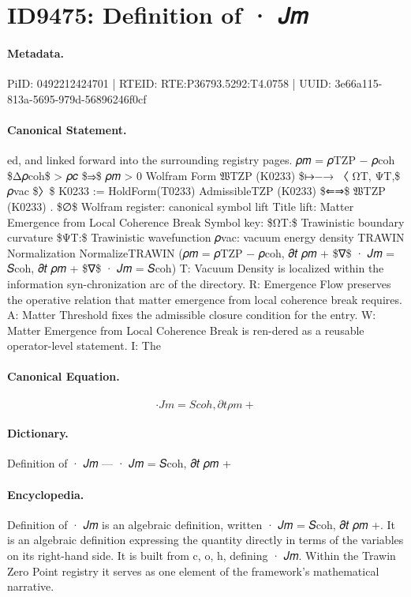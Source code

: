 \section*{ID9475: Definition of · 𝐽𝑚}
\paragraph{Metadata.}
PiID: 0492212424701 | RTEID: RTE:P36793.5292:T4.0758 | UUID: 3e66a115-813a-5695-979d-56896246f0cf

\paragraph{Canonical Statement.}
ed, and linked forward into the surrounding registry pages. 𝜌𝑚 = 𝜌TZP − 𝜌coh \$Δ𝜌coh\$ > 𝜌𝑐 \$⇒\$ 𝜌𝑚 > 0 Wolfram Form 𝔚TZP (K0233) \$↦−→ 〈 ΩT, ΨT,\$ 𝜌vac \$〉\$ K0233 := HoldForm(T0233) AdmissibleTZP (K0233) \$⇐⇒\$ 𝔚TZP (K0233) . \$∅\$ Wolfram register: canonical symbol lift Title lift: Matter Emergence from Local Coherence Break Symbol key: \$ΩT:\$ Trawinistic boundary curvature \$ΨT:\$ Trawinistic wavefunction 𝜌vac: vacuum energy density TRAWIN Normalization NormalizeTRAWIN (𝜌𝑚 = 𝜌TZP − 𝜌coh, 𝜕𝑡 𝜌𝑚 + \$∇\$ · 𝐽𝑚 = 𝑆coh, 𝜕𝑡 𝜌𝑚 + \$∇\$ · 𝐽𝑚 = 𝑆coh) T: Vacuum Density is localized within the information syn-chronization arc of the directory. R: Emergence Flow preserves the operative relation that matter emergence from local coherence break requires. A: Matter Threshold fixes the admissible closure condition for the entry. W: Matter Emergence from Local Coherence Break is ren-dered as a reusable operator-level statement. I: The

\paragraph{Canonical Equation.}
\[
· 𝐽𝑚 = 𝑆coh, 𝜕𝑡 𝜌𝑚 +
\]

\paragraph{Dictionary.}
Definition of · 𝐽𝑚 — · 𝐽𝑚 = 𝑆coh, 𝜕𝑡 𝜌𝑚 +

\paragraph{Encyclopedia.}
Definition of · 𝐽𝑚 is an algebraic definition, written · 𝐽𝑚 = 𝑆coh, 𝜕𝑡 𝜌𝑚 +. It is an algebraic definition expressing the quantity directly in terms of the variables on its right-hand side. It is built from c, o, h, defining · 𝐽𝑚. Within the Trawin Zero Point registry it serves as one element of the framework's mathematical narrative.
